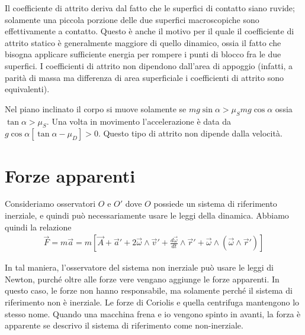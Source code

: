 \documentclass[a4paper]{article}
\begin{document}
Il coefficiente di attrito deriva dal fatto che le superfici di contatto siano
ruvide; solamente una piccola porzione delle due superfici macroscopiche sono effettivamente a contatto.
Questo è anche il motivo per il quale il coefficiente di attrito statico è generalmente maggiore
di quello dinamico, ossia il fatto che bisogna applicare sufficiente energia per rompere
i punti di blocco fra le due superfici. I coefficienti di attrito
non dipendono dall'area di appoggio (infatti, a parità di massa ma differenza di area
superficiale i coefficienti di attrito sono equivalenti).


Nel piano inclinato il corpo si muove solamente se \(mg\sin\alpha > \mu_S mg\cos\alpha\)
ossia \(\tan \alpha > \mu_S\).
Una volta in movimento l'accelerazione è data da \(g\cos\alpha\left[\tan\alpha-\mu_D\right]>0\).
Questo tipo di attrito non dipende dalla velocità.

\pagebreak

\section{Forze apparenti}

Consideriamo osservatori \(O\) e \(O'\) dove \(O\)
possiede un sistema di riferimento inerziale, e quindi può necessariamente
usare le leggi della dinamica. Abbiamo quindi la relazione
\begin{align*}
    \vec{F} = m\vec{a} = m \left[\vec{A} + \vec{a}' + 2 \vec{\omega} \wedge \vec{v}' + \frac{d\vec{\omega}}{dt} \wedge \vec{r}'
    + \vec{\omega} \wedge (\vec{\omega} \wedge \vec{r}') \right]
\end{align*}


In tal maniera, l'osservatore del sistema non inerziale può usare le leggi di Newton,
purché oltre alle forze vere vengano aggiunge le forze apparenti.
In questo caso, le forze non hanno responsabile, ma solamente perché il sistema di riferimento
non è inerziale.
Le forze di Coriolis e quella centrifuga mantengono lo stesso nome.
Quando una macchina frena e io vengono spinto in avanti, la forza è apparente
se descrivo il sistema di riferimento come non-inerziale.
\end{document}
